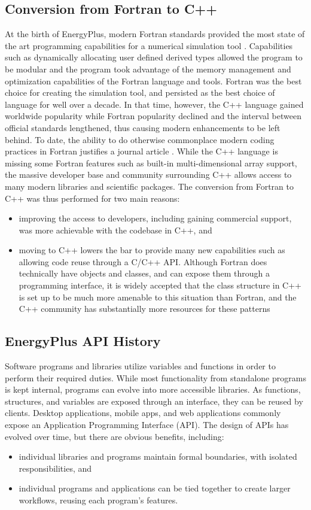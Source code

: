 \documentclass[5p, authoryear]{elsarticle}
\begin{document}
\subsection{Conversion from Fortran to C++}
At the birth of EnergyPlus, modern Fortran standards provided the most state of the art programming capabilities for a numerical simulation tool \citep{Adams1997}.
Capabilities such as dynamically allocating user defined derived types allowed the program to be modular and the program took advantage of the memory management and optimization capabilities of the Fortran language and tools.  
Fortran was the best choice for creating the simulation tool, and persisted as the best choice of language for well over a decade. 
In that time, however, the C++ language gained worldwide popularity while Fortran popularity declined and the interval between official standards lengthened, thus causing modern enhancements to be left behind.
To date, the ability to do otherwise commonplace modern coding practices in Fortran justifies a journal article \citep{Oezturan2015}.  
While the C++ language is missing some Fortran features such as built-in multi-dimensional array support, the massive developer base and community surrounding C++ allows access to many modern libraries and scientific packages.  
The conversion from Fortran to C++ was thus performed for two main reasons:
\begin{itemize}
  \item improving the access to developers, including gaining commercial support, was more achievable with the codebase in C++, and 
  \item moving to C++ lowers the bar to provide many new capabilities such as allowing code reuse through a C/C++ API.  Although Fortran does technically have objects and classes, and can expose them through a programming interface, it is widely accepted that the class structure in C++ is set up to be much more amenable to this situation than Fortran, and the C++ community has substantially more resources for these patterns
\end{itemize}

\subsection{EnergyPlus API History}
Software programs and libraries utilize variables and functions in order to perform their required duties.
While most functionality from standalone programs is kept internal, programs can evolve into more accessible libraries.
As functions, structures, and variables are exposed through an interface, they can be reused by clients.
Desktop applications, mobile apps, and web applications commonly expose an Application Programming Interface (API).
The design of APIs has evolved over time, but there are obvious benefits, including:
\begin{itemize}
 \item individual libraries and programs maintain formal boundaries, with isolated responsibilities, and
 \item individual programs and applications can be tied together to create larger workflows, reusing each program’s features.
\end{itemize}
\end{document}
